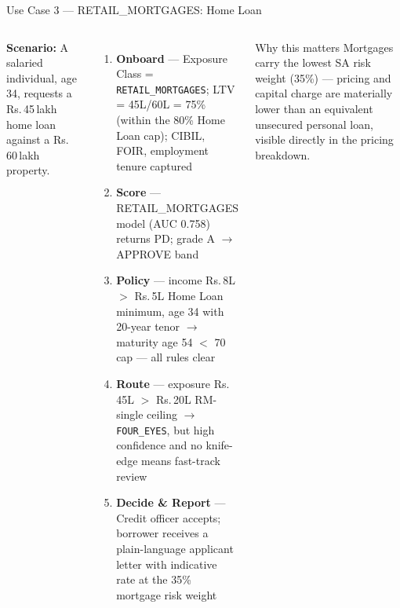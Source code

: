 \documentclass[9pt,aspectratio=169]{beamer}
\begin{document}
\begin{frame}{Use Case 3 --- RETAIL\_MORTGAGES: Home Loan}
\vspace{-2pt}
\begin{columns}[T]
    \footnotesize
    \textbf{Scenario:} A salaried individual, age 34, requests a Rs.\,45\,lakh home loan against a
    Rs.\,60\,lakh property.
    \begin{enumerate}\setlength\itemsep{4pt}
      \item[\textbf{1.}] \textbf{Onboard} --- Exposure Class = \texttt{RETAIL\_MORTGAGES};
            LTV = 45L/60L = 75\% (within the 80\% Home Loan cap); CIBIL, FOIR, employment
            tenure captured
      \item[\textbf{2.}] \textbf{Score} --- RETAIL\_MORTGAGES model (AUC 0.758) returns PD; grade
            A $\to$ APPROVE band
      \item[\textbf{3.}] \textbf{Policy} --- income Rs.\,8L $>$ Rs.\,5L Home Loan minimum, age 34 with
            20-year tenor $\to$ maturity age 54 $<$ 70 cap --- all rules clear
      \item[\textbf{4.}] \textbf{Route} --- exposure Rs.\,45L $>$ Rs.\,20L RM-single ceiling
            $\to$ \texttt{FOUR\_EYES}, but high confidence and no knife-edge means fast-track review
      \item[\textbf{5.}] \textbf{Decide \& Report} --- Credit officer accepts; borrower receives
            a plain-language applicant letter with indicative rate at the 35\% mortgage risk weight
    \end{enumerate}
    \begin{block}{Why this matters}
      \footnotesize
      Mortgages carry the lowest SA risk weight (35\%) --- pricing and capital charge are
      materially lower than an equivalent unsecured personal loan, visible directly in the
      pricing breakdown.
    \end{block}
\end{columns}
\end{frame}
\end{document}
